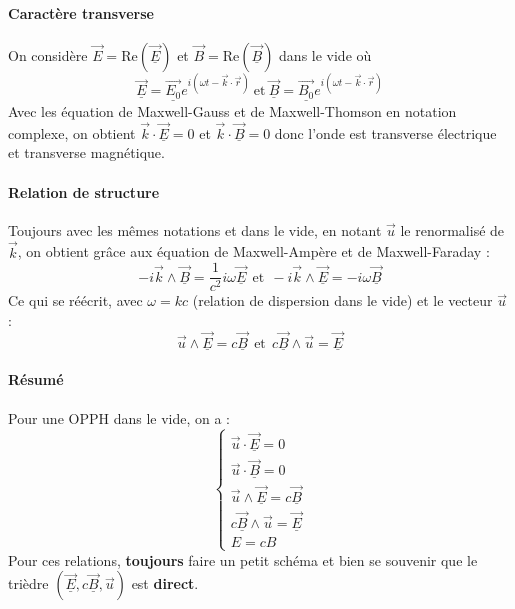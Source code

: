 \documentclass[french]{book}
\theoremstyle{plain}
\theoremstyle{definition}
\theoremstyle{remark}
\begin{document}
\paragraph{Caractère transverse} On considère $\overrightarrow{E}=\text{Re}\left(\overrightarrow{\underline{E}}\right)$ et $\overrightarrow{B}=\text{Re}\left(\overrightarrow{\underline{B}}\right)$ dans le vide où  $$\overrightarrow{\underline{E}}=\overrightarrow{\underline{E_0}}e^{i(\omega t-\overrightarrow{k}\cdot\overrightarrow{r})} \ \text{et} \ \overrightarrow{\underline{B}}=\overrightarrow{\underline{B_0}}e^{i(\omega t-\overrightarrow{k}\cdot\overrightarrow{r})}$$ Avec les équation de Maxwell-Gauss et 
de Maxwell-Thomson en notation complexe, on obtient $\overrightarrow{k}\cdot\overrightarrow{\underline{E}}=0$ et $\overrightarrow{k}\cdot\overrightarrow{\underline{B}}=0$ donc l'onde est transverse électrique et transverse magnétique.
\paragraph{Relation de structure} Toujours avec les mêmes notations et dans le vide, en notant $\overrightarrow{u}$ le renormalisé de $\overrightarrow{k}$, on obtient grâce aux équation de Maxwell-Ampère et de Maxwell-Faraday : $$-i\overrightarrow{k}\wedge\overrightarrow{\underline{B}}=\frac{1}{c^2}i\omega\overrightarrow{\underline{E}} \ \ \text{et} \ \ -i\overrightarrow{k}\wedge\overrightarrow{\underline{E}}=-i\omega\overrightarrow{\underline{B}}$$ Ce qui se réécrit, avec $\omega=kc$ (relation de dispersion dans le vide) et le vecteur $\overrightarrow{u}$ : $$\overrightarrow{u}\wedge\overrightarrow{\underline{E}}=c\overrightarrow{\underline{B}} \ \ \text{et} \ \ c\overrightarrow{\underline{B}}\wedge\overrightarrow{u}=\overrightarrow{\underline{E}}$$
\paragraph{Résumé} Pour une OPPH dans le vide, on a : 
$$\begin{cases}
	\overrightarrow{u}\cdot\overrightarrow{\underline{E}}=0 \\
	\overrightarrow{u}\cdot\overrightarrow{\underline{B}}=0 \\
	\overrightarrow{u}\wedge\overrightarrow{\underline{E}}=c\overrightarrow{\underline{B}}\\
	c\overrightarrow{\underline{B}}\wedge\overrightarrow{u}=\overrightarrow{\underline{E}}\\
	E=cB
\end{cases}$$ Pour ces relations, \textbf{toujours} faire un petit schéma et bien se souvenir que le trièdre $\left(\overrightarrow{\underline{E}},c\overrightarrow{\underline{B}},\overrightarrow{u}\right)$ est \textbf{direct}.
\end{document}
